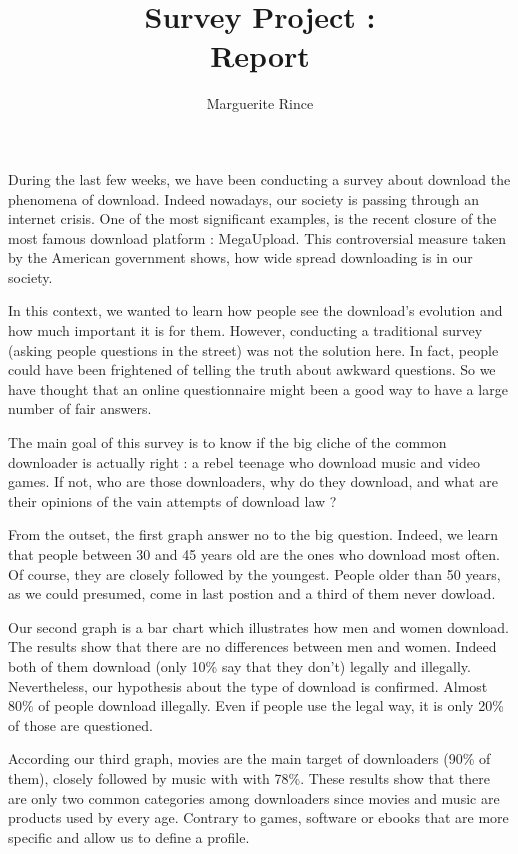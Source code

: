 \documentclass[a4paper]{article}
\title{Survey Project :\\Report}
\author{Marguerite Rince}
\begin{document}
\maketitle

During the last few weeks, we have been conducting a survey about download the phenomena of download. Indeed nowadays, our society is passing through an internet crisis. One of the most significant  examples, is the recent closure of the most famous download platform : MegaUpload. This controversial measure taken by the American government shows, how wide spread downloading is in our society. 

In this context, we wanted to learn how people see the download's evolution and how much important it is for them. However, conducting a traditional survey (asking people questions in the street) was not the solution here. In fact, people could have been frightened of telling the truth about awkward questions. So we have thought that an online questionnaire might been a good way to have a large number of fair answers.

The main goal of this survey is to know if the big cliche of the common downloader is actually right : a rebel teenage who download music and video games. If not, who are those downloaders, why do they download, and what are their opinions of the vain attempts of download law ?

From the outset, the first graph answer no to the big question. Indeed, we learn that people between  30 and 45 years old are the ones who download most often. Of course, they are closely followed by the youngest. People older than 50 years, as we could presumed, come in last postion and a third of them never dowload.

Our second graph is a bar chart which illustrates how men and women download. The results show that there are no differences between men and women. Indeed both of them download (only 10\% say that they don't) legally and illegally. Nevertheless, our hypothesis about the type of download is confirmed. Almost 80\% of people download illegally. Even if people use the legal way, it is only 20\% of those are questioned.  

According our third graph, movies are the main target of downloaders (90\% of them), closely followed by music with with 78\%. These results show that there are only two common categories among downloaders since movies and music are products used by every age. Contrary to games, software or ebooks that are more specific and allow us to define a profile. 
\end{document}
